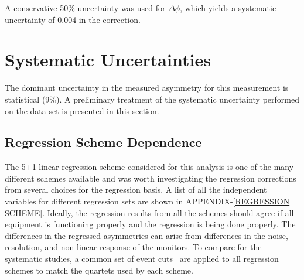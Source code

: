 A conservative 50\% uncertainty was used for $\Delta\phi$, which yields a systematic uncertainty of 0.004 in the correction.

\section{Systematic Uncertainties}
\label{Systematic Uncertainties}
The dominant uncertainty in the measured asymmetry for this measurement is statistical (9\%). A preliminary treatment of the systematic uncertainty performed on the data set is presented in this section.

\subsection{Regression Scheme Dependence}
\label{Regression Scheme Dependence}

The 5+1 linear regression scheme considered for this analysis is one of the many different schemes available and was worth investigating the regression corrections from several choices for the regression basis. A list of all the independent variables for different regression sets are shown in APPENDIX-\ref{REGRESSION SCHEME}. Ideally, the regression results from all the schemes should agree if all equipment is functioning properly and the regression is being done properly. The differences in the regressed asymmetries can arise from differences in the noise, resolution, and non-linear response of the monitors. To compare for the systematic studies, a common set of event cuts~\cite{rakitha_qweak} are applied to all regression schemes to match the quartets used by each scheme.

